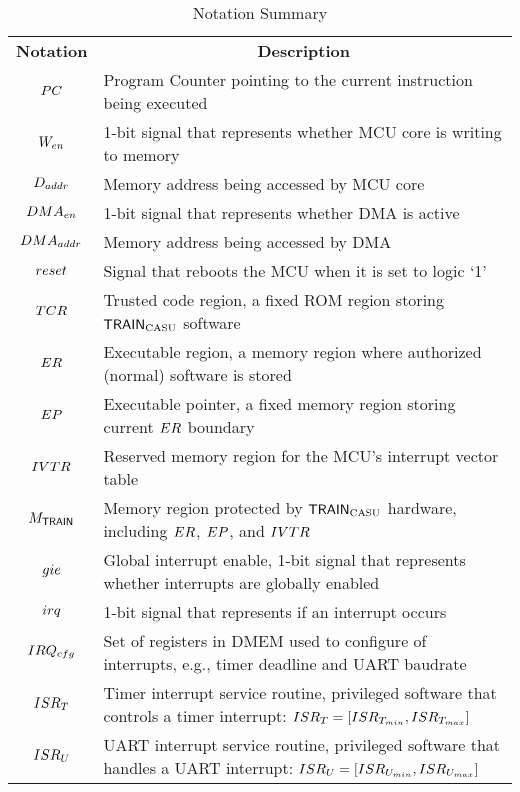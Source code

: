 \begin{table}[!t]
    \centering
    \small
    \begin{tabularx}{\linewidth}{|c|X|}
        \hline
        \rowcolor{gray!20}
        {\bf Notation} & \multicolumn{1}{c|}{\bf Description} \\            
        \thickhline
        $PC$	     & 	Program Counter pointing to the current instruction being executed \\
        \hline
        $W_{en}$ 	 &	1-bit signal that represents whether MCU core is writing to memory \\
        \hline
        $D_{addr}$ 	 &	Memory address being accessed by MCU core \\
        \hline
        $DMA_{en}$   &	1-bit signal that represents whether DMA is active \\
        \hline
        $DMA_{addr}$ &	Memory address being accessed by DMA \\
        \hline
        $reset$	 &	Signal that reboots the MCU when it is set to logic `1'\\
        \hline
        $TCR$	 &	Trusted code region, a fixed ROM region storing ${\sf{TRAIN_{{\rm CASU}}}}$ software \\
        \hline        
        $ER$	     &	Executable region, a memory region where authorized (normal) software is stored \\
        \hline
        $EP$	     &	Executable pointer, a fixed memory region storing current $ER$ boundary \\    
        \hline
        $IVTR$	 &	Reserved memory region for the MCU's interrupt vector table \\
        \hline
        $M_{{\sf{TRAIN}}}$ &  Memory region protected by ${\sf{TRAIN_{{\rm CASU}}}}$ hardware, including $ER$, $EP$, and $IVTR$ \\
        \hline
        $gie$     &  Global interrupt enable, 1-bit signal that represents whether interrupts are globally enabled \\
        \hline
        $irq$     &  1-bit signal that represents if an interrupt occurs \\
        \hline
        $IRQ_{cfg}$  &  Set of registers in DMEM used to configure of interrupts, e.g., timer deadline and UART baudrate\\
        \hline
        $ISR_T$    &  Timer interrupt service routine, privileged software that controls a timer interrupt: \newline
                        $ISR_T = [ISR_{T_{min}}, ISR_{T_{max}}]$ \\    
        \hline
        $ISR_U$    &  UART interrupt service routine, privileged software that handles a UART interrupt: \newline
                        $ISR_U = [ISR_{U_{min}}, ISR_{U_{max}}]$ \\
        \hline        
    \end{tabularx}
    \caption{Notation Summary}
\label{table:notations}
\end{table}



